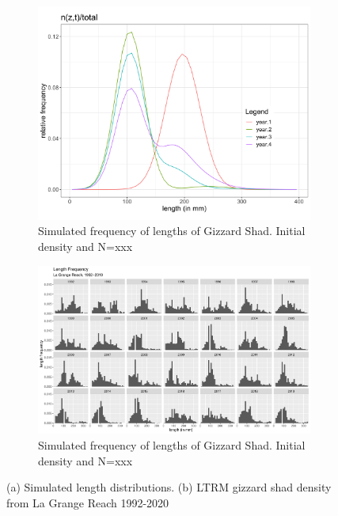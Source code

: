 \documentclass[preprint,review,12pt,authoryear]{elsarticle}
\begin{document}

%
%

\begin{figure}
\centering
\begin{subfigure}[b]{.43\textwidth}
  \includegraphics[width=\textwidth]{figures/sim.png}
\caption{Simulated frequency of lengths of Gizzard Shad.  Initial density  and N=xxx}
\label{fig:length_dist}
\end{subfigure}
\begin{subfigure}[b]{.43\textwidth}
\includegraphics[width=\textwidth]{figures/LTRMgraph.pdf}
\caption{Simulated frequency of lengths of Gizzard Shad.  Initial density  and N=xxx}
\label{fig:length_dist}
\end{subfigure}
\caption{(a) Simulated length distributions. (b) LTRM gizzard shad density from La Grange Reach 1992-2020}
\end{figure}    
\end{document}
